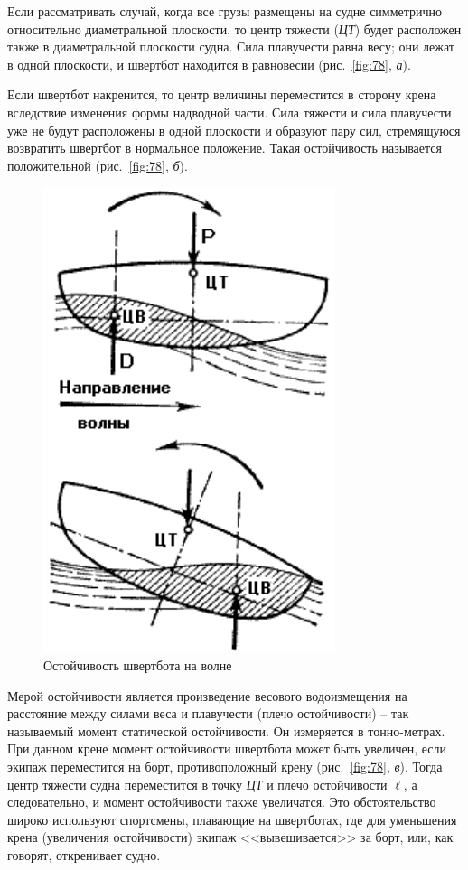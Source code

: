 \documentclass[a4paper, 12pt, twoside, final]{scrbook}
\begin{document}
Если рассматривать случай, когда все грузы размещены на судне симметрично относительно диаметральной плоскости, то центр тяжести (\textit{ЦТ}) будет расположен также в диаметральной плоскости судна. Сила плавучести равна весу; они лежат в одной плоскости, и швертбот находится в равновесии (рис.~\ref{fig:78}, \textit{а}).

Если швертбот накренится, то центр величины переместится в сторону крена вследствие изменения формы надводной части. Сила тяжести и сила плавучести уже не будут расположены в одной плоскости и образуют пару сил, стремящуюся возвратить швертбот в нормальное положение. Такая остойчивость называется положительной (рис.~\ref{fig:78}, \textit{б}).

\begin{figure}
   \centering
   \includegraphics{pics/79_Ostojchivost_shvertbota_na_volne} %
   \caption{Остойчивость швертбота на волне}
   \label{fig:79}
\end{figure}

Мерой остойчивости является произведение весового водоизмещения на расстояние между силами веса и плавучести (плечо остойчивости) \--- так называемый момент статической остойчивости. Он измеряется в тонно-метрах. При данном крене момент остойчивости швертбота может быть увеличен, если экипаж переместится на борт, противоположный крену (рис.~\ref{fig:78}, \textit{в}). Тогда центр тяжести судна переместится в точку \textit{ЦТ} и плечо остойчивости $\ell$, а следовательно, и момент остойчивости также увеличатся. Это обстоятельство широко используют спортсмены, плавающие на швертботах, где для уменьшения крена (увеличения остойчивости) экипаж <<вывешивается>> за борт, или, как говорят, откренивает судно.
\end{document}
